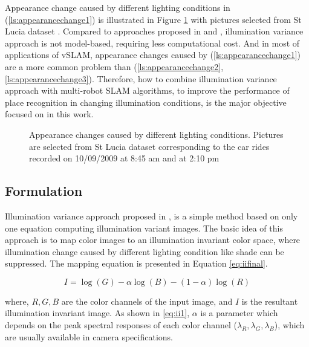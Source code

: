 Appearance change caused by different lighting conditions in (\ref{ls:appearancechange1}) is illustrated in Figure \ref{fig:shadecompare1} with pictures selected from St Lucia dataset \cite{glover2010fab}. Compared to approaches proposed in \cite{mcmanus2013distraction} and \cite{churchill2012practice}, illumination variance approach is not model-based, requiring less computational cost. And in most of applications of vSLAM, appearance changes caused by (\ref{ls:appearancechange1}) are a more common problem than (\ref{ls:appearancechange2}, \ref{ls:appearancechange3}). Therefore, how to combine illumination variance approach with multi-robot SLAM algorithms, to improve the performance of place recognition in changing illumination conditions, is the major objective focused on in this work.

\begin{figure}
	\centering
	\caption{Appearance changes caused by different lighting conditions. Pictures are selected from St Lucia dataset corresponding to the car rides recorded on 10/09/2009 at 8:45 am and at 2:10 pm}
	\label{fig:shadecompare1}
\end{figure}

\subsection{Formulation}
Illumination variance approach proposed in \cite{maddern2014illumination}, is a simple method based on only one equation computing illumination variant images. The basic idea of this approach is to map color images to an illumination invariant color space, where illumination change caused by different lighting condition like shade can be suppressed. The mapping equation
is presented in Equation \ref{eq:iifinal}.

\begin{equation}
I=\log(G)-\alpha\log(B)-(1-\alpha)\log(R)
\label{eq:iifinal}
\end{equation}

where, $R, G, B$ are the color channels of the input image, and $I$ is the resultant illumination invariant image. As shown in \ref{eq:ii1}, $\alpha$ is a parameter which depends on the peak spectral responses of each color channel ($\lambda_R, \lambda_G, \lambda_B$), which are usually available in camera specifications.

